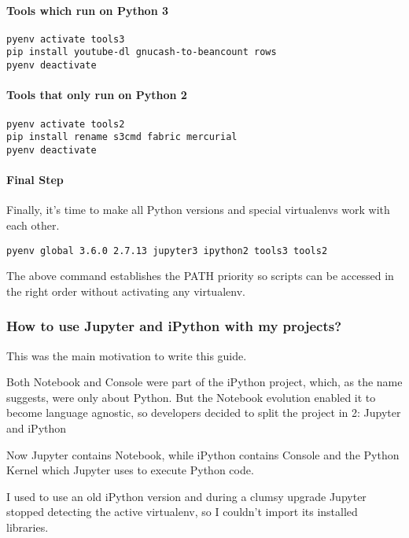 \documentclass[11pt]{article}
\begin{document}
\paragraph{Tools which run on Python 3}
\label{sec:org70cd959}

\begin{verbatim}
pyenv activate tools3
pip install youtube-dl gnucash-to-beancount rows 
pyenv deactivate
\end{verbatim}

\paragraph{Tools that only run on Python 2}
\label{sec:orga66b052}

\begin{verbatim}
pyenv activate tools2
pip install rename s3cmd fabric mercurial
pyenv deactivate
\end{verbatim}

\paragraph{Final Step}
\label{sec:org747d8d4}
Finally, it's time to make all Python versions and special virtualenvs work with each other.

\begin{verbatim}
pyenv global 3.6.0 2.7.13 jupyter3 ipython2 tools3 tools2
\end{verbatim}

The above command establishes the PATH priority so scripts can be accessed in the right order without activating any virtualenv.

\subsubsection{How to use Jupyter and iPython with my projects?}
\label{sec:org3cffbef}

This was the main motivation to write this guide.

Both Notebook and Console were part of the iPython project, which, as the name suggests, were only about Python. But the Notebook evolution enabled it to become language agnostic, so developers decided to split the project in 2: Jupyter and iPython

Now Jupyter contains Notebook, while iPython contains Console and the Python Kernel which Jupyter uses to execute Python code.

I used to use an old iPython version and during a clumsy upgrade Jupyter stopped detecting the active virtualenv, so I couldn't import its installed libraries.
\end{document}

